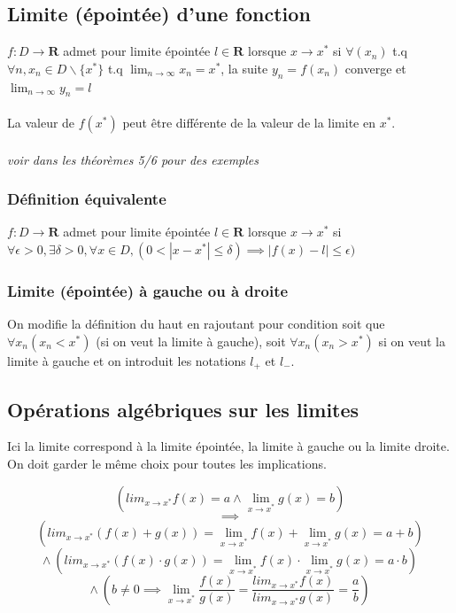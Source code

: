\documentclass{article}
\begin{document}
\subsection{Limite (épointée) d'une fonction}

$ f : D \to \mathbf{R} $ admet pour limite épointée $ l \in \mathbf{R} $ lorsque $ x \to x^* $ si $ \forall (x_n) $ t.q $ \forall n, x_n \in D \backslash \{x^*\} $ t.q $ \lim_{n\to\infty} x_n = x^*$, la suite $ y_n = f(x_n) $ converge et $ \lim_{n\to\infty} y_n = l$\\\\
La valeur de $ f(x^*) $ peut être différente de la valeur de la limite en $ x^* $.\\\\
\textit{voir dans les théorèmes 5/6 pour des exemples}

\subsubsection{Définition équivalente}

$ f : D \to \mathbf{R} $ admet pour limite épointée $ l \in \mathbf{R} $ lorsque $ x \to x^* $ si $ \forall \epsilon > 0, \exists \delta > 0, \forall x \in D, (0 < |x-x^*| \leq \delta) \implies |f(x) - l| \leq \epsilon)$

\subsubsection{Limite (épointée) à gauche ou à droite}

On modifie la définition du haut en rajoutant pour condition soit que $ \forall x_n (x_n < x^*) $ (si on veut la limite à gauche), soit $ \forall x_n (x_n > x^*)$ si on veut la limite à gauche et on introduit les notations $ l_+ $ et $ l_-$.

\subsection{Opérations algébriques sur les limites}

Ici la limite correspond à la limite épointée, la limite à gauche ou la limite droite. On doit garder le même choix pour toutes les implications.

\[ (lim_{x\to{x^*}} f(x) = a \wedge \lim_{x\to{x^*}} g(x) = b) \]
\[ \implies \]
\[ (lim_{x\to{x^*}} (f(x) + g(x)) = \lim_{x\to{x^*}} f(x) + \lim_{x\to{x^*}} g(x) = a + b) \]
\[ \wedge\ (lim_{x\to{x^*}} (f(x) \cdot g(x)) = \lim_{x\to{x^*}} f(x) \cdot \lim_{x\to{x^*}} g(x) = a \cdot b) \]
\[ \wedge\ (b \neq 0 \implies \lim_{x\to{x^*}} \frac{f(x)}{g(x)} = \frac{lim_{x\to{x^*}} f(x)}{lim_{x\to{x^*}} g(x)} = \frac{a}{b}) \]
\end{document}
